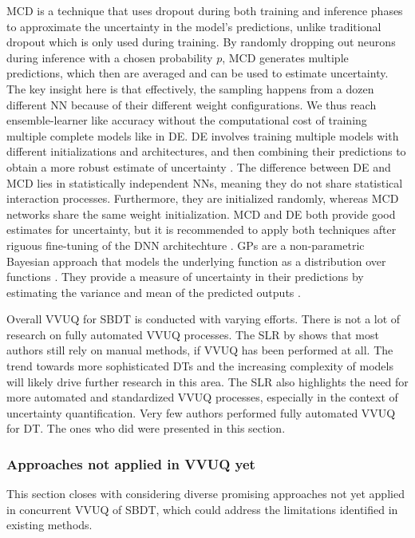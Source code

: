 MCD is a technique that uses dropout \autocite{srivastava2014dropout} during both training and inference phases to approximate the uncertainty in the model's predictions, unlike traditional dropout which is only used during training. By randomly dropping out neurons during inference with a chosen probability $p$, MCD generates multiple predictions, which then are averaged and can be used to estimate uncertainty. The key insight here is that effectively, the sampling happens from a dozen different NN because of their different weight configurations. We thus reach ensemble-learner like accuracy without the computational cost of training multiple complete models like in DE.
DE involves training multiple models with different initializations and architectures, and then combining their predictions to obtain a more robust estimate of uncertainty \autocite{rahaman2021uncertainty}. The difference between DE and MCD lies in statistically independent NNs, meaning they do not share statistical interaction processes. Furthermore, they are initialized randomly, whereas MCD networks share the same weight initialization. MCD and DE both provide good estimates for uncertainty, but it is recommended to apply both techniques after riguous fine-tuning of the DNN architechture \autocite{kamali2024advancements}.
GPs are a non-parametric Bayesian approach that models the underlying function as a distribution over functions \autocite{bilionis2012multi}. They provide a measure of uncertainty in their predictions by estimating the variance and mean of the predicted outputs \autocite{Burr2025TEADT}.

Overall VVUQ for SBDT is conducted with varying efforts. There is not a lot of research on fully automated VVUQ processes. The SLR by \autocite{Bitencourt2023} shows that most authors still rely on manual methods, if VVUQ has been performed at all. The trend towards more sophisticated DTs and the increasing complexity of models will likely drive further research in this area. The SLR also highlights the need for more automated and standardized VVUQ processes, especially in the context of uncertainty quantification. Very few authors performed fully automated VVUQ for DT. The ones who did were presented in this section.

\subsubsection*{Approaches not applied in VVUQ yet}
\label{sec:promising-future-directions}
This section closes with considering diverse promising approaches not yet applied in concurrent VVUQ of SBDT, which could address the limitations identified in existing methods.

